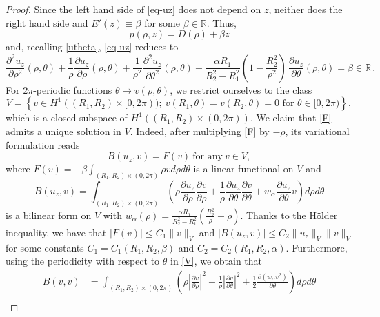 \documentclass[a4paper,11pt]{amsart}
\numberwithin{equation}{section}
\numberwithin{figure}{section}
\newcommand{\R}{\mathbb{R}}
\begin{document}
\begin{proof}
		Since the left hand side of \eqref{eq-uz} does not depend on $z$, neither does the right hand side and $E'(z)\equiv\beta$ for some $\beta\in\R$.
		Thus,
		\begin{equation}\label{sepa-pres}
			p(\rho,z)=D(\rho)+\beta z
		\end{equation}and,
		recalling \eqref{utheta}, \eqref{eq-uz} reduces to
		\begin{equation}\label{F}
			\frac{\partial^2 u_z}{\partial\rho^2}(\rho,\theta)+\frac{1}{\rho}\frac{\partial u_z}{\partial\rho}(\rho,\theta)+
			\frac{1}{\rho^2}\frac{\partial^2 u_z}{\partial\theta^2}(\rho,\theta)+
			\frac{\alpha R_1 }{R_2^2 -R_1^2} \left(1-\frac{R_2^2}{\rho^2}\right)\, \frac{\partial u_z}{\partial\theta}(\rho,\theta)=\beta\in\R\, .
		\end{equation}
		For $2\pi$-periodic functions $\theta\mapsto v(\rho, \theta)$, we restrict ourselves to the class
		\begin{equation}\label{V}
			V=\left\{v\in H^1((R_1,R_2)\times [0,2\pi));\ v(R_1,\theta)=v(R_2, \theta)=0  \text{ for $\theta\in[0,2\pi)$}\right\},
		\end{equation}which is a closed subspace of $H^1((R_1,R_2)\times (0,2\pi))$. 	We claim that \eqref{F} admits a unique solution in $V$.
		Indeed, after multiplying \eqref{F} by $-\rho$, its variational formulation reads
		\begin{equation}\label{var-form}
			B(u_z, v)= F(v) \ \text{for any} \ v\in V,
		\end{equation}
		where $F(v)=-\beta\int_{(R_1,R_2)\times (0,2\pi)} \rho vd\rho d\theta$ is a linear functional on $V$ and \begin{equation}\label{B}B(u_z, v)=\int_{(R_1,R_2)\times (0,2\pi)} \left(\rho \frac{\partial u_z}{\partial \rho}\frac{\partial v}{\partial \rho} + \frac{1}{\rho}\frac{\partial u_z}{\partial \theta} \frac{\partial v}{\partial \theta} + w_\alpha \frac{\partial u_z}{\partial \theta}v\right) d\rho d\theta\end{equation} is a bilinear form on $V$ with $w_\alpha(\rho)= \frac{\alpha R_1}{R_2^2-R_1^2}\left( \frac{R_2^2}{\rho} -\rho\right)$. Thanks to the Hölder inequality, we have that $|F(v)|\leq C_1\|v\|_V$ and $|B(u_z, v)|\leq C_2 \|u_z\|_{V}\|v\|_{V}$ for some constants $C_1=C_1(R_1,R_2,\beta)$ and $C_2=C_2(R_1,R_2, \alpha)$. Furthermore, using the periodicity with respect to $\theta$ in \eqref{V}, we obtain that
		\begin{equation*}\begin{aligned}
				B(v, v)&= \int_{(R_1,R_2)\times (0,2\pi)} \left( \rho\left|\frac{\partial v}{\partial \rho}\right|^2 + \frac{1}{\rho}\left|\frac{\partial v}{\partial \theta}\right|^2 +\frac{1 }{2}\frac{\partial (w_\alpha v^2)}{\partial \theta} \right) d\rho d\theta\\

\end{aligned}
\end{equation*}
\end{proof}
\end{document}
